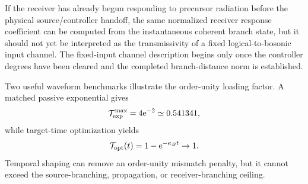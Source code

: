 If the receiver has already begun responding to precursor radiation before the physical source/controller handoff, the same normalized receiver response coefficient can be computed from the instantaneous coherent branch state, but it should not yet be interpreted as the transmissivity of a fixed logical-to-bosonic input channel. The fixed-input channel description begins only once the controller degrees have been cleared and the completed branch-distance norm is established.

Two useful waveform benchmarks illustrate the order-unity loading factor. A matched passive exponential gives
\begin{equation}
\mathcal T_{\rm exp}^{\max}=4\mathrm{e}^{-2}\simeq0.541341,
\end{equation}
while target-time optimization yields
\begin{equation}
\mathcal T_{\rm opt}(t)=1-\mathrm{e}^{-\kappa_B t}\to1.
\end{equation}
Temporal shaping can remove an order-unity mismatch penalty, but it cannot exceed the source-branching, propagation, or receiver-branching ceiling.
